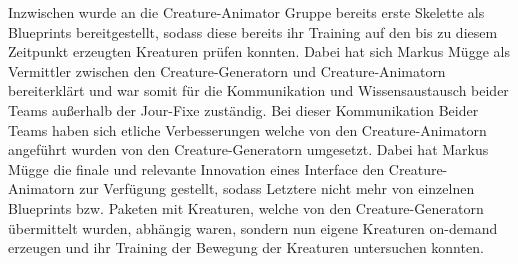 Inzwischen wurde an die Creature-Animator Gruppe bereits erste Skelette als Blueprints bereitgestellt, sodass diese bereits ihr Training auf den bis zu diesem Zeitpunkt erzeugten Kreaturen prüfen konnten. Dabei hat sich Markus Mügge als Vermittler zwischen den Creature-Generatorn und Creature-Animatorn bereiterklärt und war somit für die Kommunikation und Wissensaustausch beider Teams außerhalb der Jour-Fixe zuständig. Bei dieser Kommunikation Beider Teams haben sich etliche Verbesserungen welche von den Creature-Animatorn angeführt wurden von den Creature-Generatorn umgesetzt. Dabei hat Markus Mügge die finale und relevante Innovation eines Interface den Creature-Animatorn zur Verfügung gestellt, sodass Letztere nicht mehr von einzelnen Blueprints bzw. Paketen mit Kreaturen, welche von den Creature-Generatorn übermittelt wurden, abhängig waren, sondern nun eigene Kreaturen on-demand erzeugen und ihr Training der Bewegung der Kreaturen untersuchen konnten.



